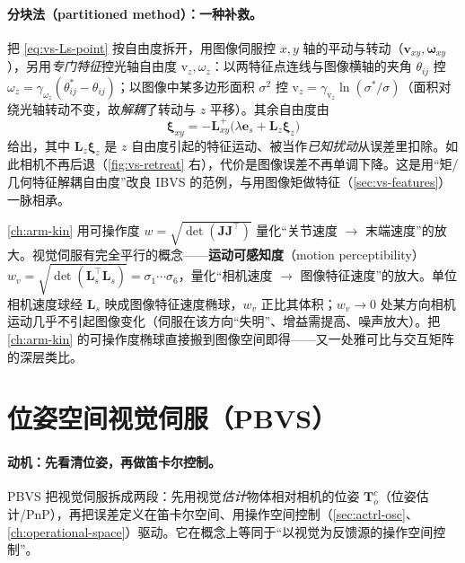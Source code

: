 \paragraph{分块法（partitioned method）：一种补救。}
把 \cref{eq:vs-Ls-point} 按自由度拆开，用图像伺服控 $x,y$ 轴的平动与转动（$\mathbf{v}_{xy},\boldsymbol{\omega}_{xy}$），另用\emph{专门特征}控光轴自由度 $\mathrm{v}_z,\omega_z$\cite{spong2006robot}：以两特征点连线与图像横轴的夹角 $\theta_{ij}$ 控 $\omega_z=\gamma_{\omega_z}(\theta_{ij}^\ast-\theta_{ij})$；以图像中某多边形面积 $\sigma^2$ 控 $\mathrm{v}_z=\gamma_{\mathrm{v}_z}\ln(\sigma^\ast/\sigma)$（面积对绕光轴转动不变，故\emph{解耦}了转动与 $z$ 平移）。其余自由度由
\begin{equation}
  \boldsymbol{\xi}_{xy}=-\mathbf{L}_{xy}^{+}\big(\lambda\mathbf{e}_s+\mathbf{L}_z\boldsymbol{\xi}_z\big)
  \label{eq:vs-partitioned}
\end{equation}
给出，其中 $\mathbf{L}_z\boldsymbol{\xi}_z$ 是 $z$ 自由度引起的特征运动、被当作\emph{已知扰动}从误差里扣除。如此相机不再后退（\cref{fig:vs-retreat} 右），代价是图像误差不再单调下降。这是用“矩/几何特征解耦自由度”改良 IBVS 的范例，与用图像矩做特征（\cref{sec:vs-features}）一脉相承。

\begin{insight}\label{insight:vs-perceptibility}
\cref{ch:arm-kin} 用可操作度 $w=\sqrt{\det(\mathbf{J}\mathbf{J}^\top)}$ 量化“关节速度 $\to$ 末端速度”的放大。视觉伺服有完全平行的概念——\textbf{运动可感知度}（motion perceptibility）$w_v=\sqrt{\det(\mathbf{L}_s^\top\mathbf{L}_s)}=\sigma_1\cdots\sigma_6$，量化“相机速度 $\to$ 图像特征速度”的放大\cite{spong2006robot}。单位相机速度球经 $\mathbf{L}_s$ 映成图像特征速度椭球，$w_v$ 正比其体积；$w_v\to0$ 处某方向相机运动几乎不引起图像变化（伺服在该方向“失明”、增益需提高、噪声放大）。把 \cref{ch:arm-kin} 的可操作度椭球直接搬到图像空间即得——又一处雅可比与交互矩阵的深层类比。
\end{insight}

\section{位姿空间视觉伺服（PBVS）}
\label{sec:vs-pbvs}

\paragraph{动机：先看清位姿，再做笛卡尔控制。}
PBVS 把视觉伺服拆成两段：先用视觉\emph{估计}物体相对相机的位姿 $\mathbf{T}_o^c$（位姿估计/PnP），再把误差定义在笛卡尔空间、用操作空间控制（\cref{sec:actrl-osc}、\cref{ch:operational-space}）驱动。它在概念上等同于“以视觉为反馈源的操作空间控制”。

